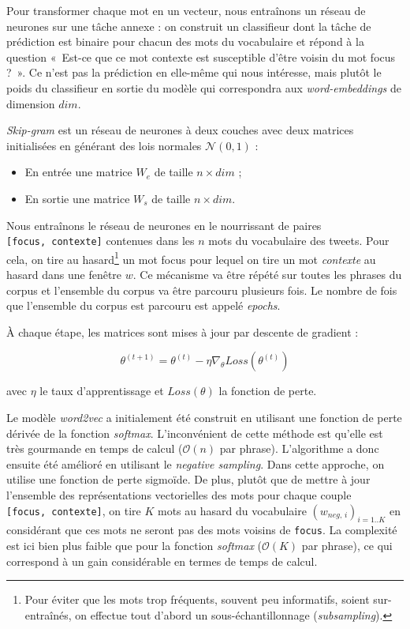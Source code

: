 \documentclass[10pt,french,french]{article}
\let\rmarkdownfootnote\footnote%
\def\footnote{\protect\rmarkdownfootnote}
\begin{document}
Pour transformer chaque mot en un vecteur, nous entraînons un réseau de
neurones sur une tâche annexe : on construit un classifieur dont la
tâche de prédiction est binaire pour chacun des mots du vocabulaire et
répond à la question «~Est-ce que ce mot contexte est susceptible d'être
voisin du mot focus ?~». Ce n'est pas la prédiction en elle-même qui
nous intéresse, mais plutôt le poids du classifieur en sortie du modèle
qui correspondra aux \emph{word-embeddings} de dimension \(dim\).

\emph{Skip-gram} est un réseau de neurones à deux couches avec deux
matrices initialisées en générant des lois normales \(\mathcal N(0,1)\)
:

\begin{itemize}
\item
  En entrée une matrice \(W_e\) de taille \(n\times dim\) ;
\item
  En sortie une matrice \(W_s\) de taille \(n\times dim\).
\end{itemize}

Nous entraînons le réseau de neurones en le nourrissant de paires
\texttt{{[}focus,\ contexte{]}} contenues dans les \(n\) mots du
vocabulaire des tweets. Pour cela, on tire au hasard\footnote{Pour
  éviter que les mots trop fréquents, souvent peu informatifs, soient
  sur-entraînés, on effectue tout d'abord un sous-échantillonnage
  (\emph{subsampling}).} un mot focus pour lequel on tire un mot
\emph{contexte} au hasard dans une fenêtre \(w\). Ce mécanisme va être
répété sur toutes les phrases du corpus et l'ensemble du corpus va être
parcouru plusieurs fois. Le nombre de fois que l'ensemble du corpus est
parcouru est appelé \emph{epochs}.

À chaque étape, les matrices sont mises à jour par descente de gradient
:

\[\theta^{(t+1)} = \theta^{(t)} - \eta \nabla_\theta Loss(\theta^{(t)})\]

avec \(\eta\) le taux d'apprentissage et \(Loss(\theta)\) la fonction de
perte.

Le modèle \emph{word2vec} a initialement été construit en utilisant une
fonction de perte dérivée de la fonction \emph{softmax}. L'inconvénient
de cette méthode est qu'elle est très gourmande en temps de calcul
(\(\mathcal O(n)\) par phrase). L'algorithme a donc ensuite été amélioré
en utilisant le \emph{negative sampling}. Dans cette approche, on
utilise une fonction de perte sigmoïde. De plus, plutôt que de mettre à
jour l'ensemble des représentations vectorielles des mots pour chaque
couple \texttt{{[}focus,\ contexte{]}}, on tire \(K\) mots au hasard du
vocabulaire \((w_{neg,\,i})_{i=1..K}\) en considérant que ces mots ne
seront pas des mots voisins de \texttt{focus}. La complexité est ici
bien plus faible que pour la fonction \emph{softmax} (\(\mathcal O(K)\)
par phrase), ce qui correspond à un gain considérable en termes de temps
de calcul.
\end{document}
